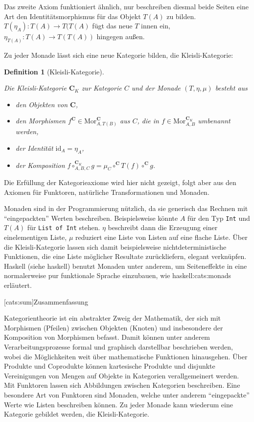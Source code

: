 \documentclass[12pt, a4paper, bibgerm]{scrbook}
\newcommand\icode[1]{\lstinline?#1?}
\newcommand\lsection{}
\newcommand\cref{}
\newcommand\sref{}
\newcommand\ato{\rightarrow} %
\newtheorem{defini}{Definition}
\newcommand{\defi}[2]{%
  \begin{defini}[#1]
    \label{def:#1}
    #2
  \end{defini}
}
\newcommand{\seec}[1]{(siehe \cref{#1})}
\begin{document}
Das zweite Axiom funktioniert ähnlich, nur beschreiben diesmal beide
Seiten eine Art den Identitätsmorphismus für das Objekt $T(A)$ zu
bilden. $T(\eta_A):T(A) \ato T(T(A)$ fügt das neue $T$ innen ein,
$\eta_{T(A)}:T(A) \ato T(T(A))$ hingegen außen.

Zu jeder Monade lässt sich eine neue Kategorie bilden, die Kleisli-Kategorie:
\defi{Kleisli-Kategorie}{
Die Kleisli-Kategorie $\mathbf{C}_K$ zur Kategorie $C$ und der
Monade $(T,\eta,\mu)$ besteht aus
\begin{itemize}
\item den Objekten von $\mathbf{C}$,
\item den Morphismen $f^{\mathbf{C}} \in
  \mathrm{Mor}^{\mathbf{C}}_{A,T(B)}$ aus $C$, die in $f \in
  \mathrm{Mor}^{\mathbf{C}_K}_{A,B}$ umbenannt werden,
\item der Identität $\mathrm{id}_A = \eta_A$,
\item der Komposition $f \circ^{\mathbf{C}_K}_{A,B,C} g = \mu_C
  \circ^{\mathbf{C}} T(f) \circ^{\mathbf{C}} g$.
\end{itemize}
}
Die Erfüllung der Kategorieaxiome wird hier nicht gezeigt, folgt aber
aus den Axiomen für Funktoren, natürliche Transformationen und Monaden.

Monaden sind in der Programmierung nützlich, da sie generisch das
Rechnen mit "`eingepackten"' Werten beschreiben. Beispielsweise könnte
$A$ für den Typ \icode{Int} und $T(A)$ für \icode{List of Int}
stehen. $\eta$ beschreibt dann die Erzeugung einer einelementigen Liste,
$\mu$ reduziert eine Liste von Listen auf eine flache Liste. Über die
Kleisli-Kategorie lassen sich damit beispielsweise nichtdeterministische
Funktionen, die eine Liste möglicher Resultate zurückliefern, elegant
verknüpfen. Haskell \seec{haskell} benutzt Monaden unter
anderem, um Seiteneffekte in eine normalerweise pur funktionale Sprache
einzubauen, wie \sref{haskell:cats:monads} erläutert.

\lsection[cats:sum]{Zusammenfassung}

Kategorientheorie ist ein abstrakter Zweig der Mathematik, der sich mit
Morphismen (Pfeilen) zwischen Objekten (Knoten) und insbesondere der
Komposition von Morphismen befasst. Damit können unter anderem
Verarbeitungsprozesse formal und graphisch darstellbar beschrieben
werden, wobei die Möglichkeiten weit über mathematische Funktionen
hinausgehen. Über Produkte und Coprodukte können kartesische Produkte
und disjunkte Vereinigungen von Mengen auf Objekte in Kategorien
verallgemeinert werden. Mit Funktoren lassen sich Abbildungen zwischen
Kategorien beschreiben. Eine besondere Art von Funktoren sind Monaden,
welche unter anderem "`eingepackte"' Werte wie Listen beschreiben
können. Zu jeder Monade kann wiederum eine Kategorie gebildet werden,
die Kleisli-Kategorie.
\end{document}
